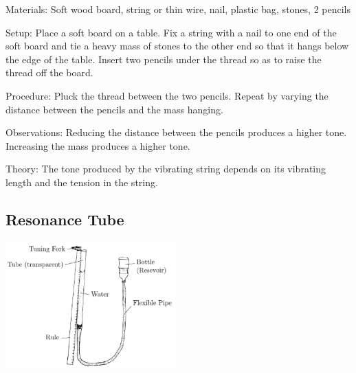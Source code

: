 \begin{multicols}{2}
\begin{description*}
\item[Materials:]{Soft wood board, string or thin wire, nail, plastic bag, stones, 2 pencils}
\item[Setup:]{Place a soft board on a table. Fix a string with a nail to one end of the soft board and tie a heavy mass of stones to the other end so that it hangs below the edge of the table. Insert two pencils under the thread so as to raise the thread off the board.}
\item[Procedure:]{Pluck the thread between the two pencils. Repeat by varying the distance between the pencils and the mass hanging.}
\item[Observations:]{Reducing the distance between the pencils produces a higher tone. Increasing the mass produces a higher tone.}
\item[Theory:]{The tone produced by the vibrating string depends on its vibrating length and the tension in the string.}
\end{description*}

\vfill
\columnbreak

\subsection{Resonance Tube} 

\begin{center}
\includegraphics[width=0.49\textwidth]{./img/resonance-tube.png}
\end{center}


\end{multicols}
